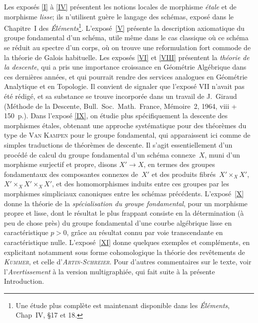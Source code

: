 Les expos\'es \ref{I} \`a \ref{IV} pr\'esentent les notions locales de
morphisme \emph{étale} et de morphisme \emph{lisse}; ils
n'utilisent gu\`ere le langage des sch\'emas, expos\'e dans le
Chapitre~I des \emph{Éléments}\footnote{Une \'etude plus
compl\`ete est maintenant disponible dans les \emph{Éléments},
Chap~IV, \oldS\S 17 et 18.}. L'expos\'e~\ref{V} pr\'esente la description
axiomatique du groupe fondamental d'un sch\'ema, utile m\^eme dans
le cas classique o\`u ce sch\'ema se r\'eduit au spectre d'un
corps, o\`u on trouve une reformulation fort commode de la
th\'eorie de Galois habituelle. Les expos\'es \ref{VI} et \ref{VIII}
pr\'esentent la \emph{théorie de la descente}, qui a pris une
importance croissance en G\'eom\'etrie Alg\'ebrique dans ces
derni\`eres ann\'ees, et qui pourrait rendre des services
analogues en G\'eom\'etrie Analytique et en Topologie. Il convient
de signaler que l'expos\'e VII n'avait pas \'et\'e
r\'edig\'e, et sa substance se trouve
incorpor\'ee
dans un
travail de J.\, Giraud (M\'ethode de la Descente, Bull.\ Soc.\ Math.\
France, M\'emoire~2, 1964, viii + 150~p.). Dans l'expos\'e \ref{IX}, on
\'etudie plus sp\'ecifiquement la descente des morphismes
\'etales, obtenant une approche syst\'ematique pour des
th\'eor\`emes du type de \textsc{Van Kampen} pour le groupe fondamental,
qui apparaissent ici comme de simples traductions de th\'eor\`emes
de descente. Il s'agit essentiellement d'un proc\'ed\'e de calcul
du groupe fondamental d'un sch\'ema connexe~$X$, muni d'un morphisme
surjectif et propre, disons $X'\to X$, en termes des groupes
fondamentaux des composantes connexes de~$X'$ et des produits
fibr\'es~$X'\times_X X'$, $X'\times_X X'\times_X X'$, et des
homomorphismes induits entre ces groupes par les morphismes
simpliciaux canoniques entre les sch\'emas
pr\'ec\'edents. L'expos\'e~\ref{X} donne la th\'eorie de la
\emph{spécialisation du groupe fondamental}, pour un morphisme
propre et lisse, dont le r\'esultat le plus frappant consiste en la
d\'etermination (\`a peu de chose pr\`es) du groupe fondamental
d'une courbe alg\'ebrique lisse en caract\'eristique $p>0$,
gr\^ace au r\'esultat connu par voie transcendante en
caract\'eristique nulle. L'expos\'e~\ref{XI} donne quelques exemples et
compl\'ements, en explicitant notamment sous forme cohomologique la
th\'eorie des rev\^etements de \emph{\textsc{Kummer}}, et celle
d'\emph{\textsc{Artin}-\textsc{Schreier}}. Pour d'autres commentaires sur le texte,
voir l'\emph{Avertissement} \`a la version multigraphi\'ee, qui
fait suite \`a la pr\'esente Introduction.


